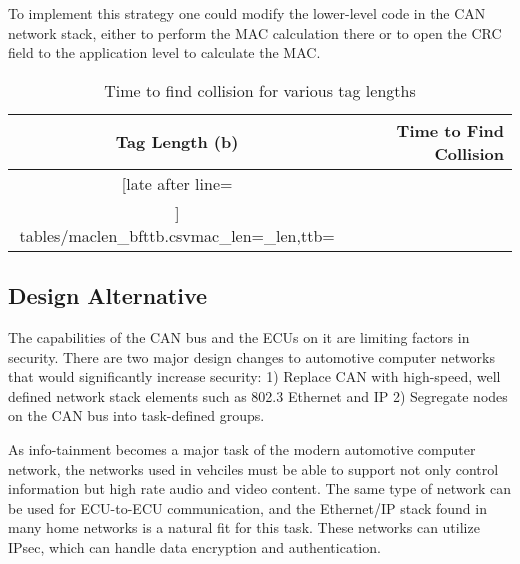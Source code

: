 
To implement this strategy one could modify the lower-level code in the CAN network stack, 
either to perform the MAC calculation there 
or to open the CRC field to the application level to calculate the MAC.


	\begin{table}	
	\centering
	\caption{Time to find collision for various tag lengths}\label{tab-taglength}
	\vspace{8pt}
	\begin{tabular}{|c|r|}\hline%
	\bfseries Tag Length (b) & \bfseries Time to Find Collision\\\hline \csvreader[late after line=\\]%
		{tables/maclen_bfttb.csv}{mac_len=\mac_len,ttb=\ttb}%
		{\mac_len & \ttb}%
		\hline
	\end{tabular}
	\end{table}
	

\subsection{Design Alternative}
\label{alternatives}

The capabilities of the CAN bus and the ECUs on it are limiting factors in security. There are two major design changes to automotive computer networks that would significantly increase security: 1) Replace CAN with high-speed, well defined network stack elements such as 802.3 Ethernet and IP 2) Segregate nodes on the CAN bus into task-defined groups.

As info-tainment becomes a major task of the modern automotive computer network, the networks used in vehciles must be able to support not only control information but high rate audio and video content. The same type of network can be used for ECU-to-ECU communication, and the Ethernet/IP stack found in many home networks is a natural fit for this task. These networks can utilize IPsec, which can handle data encryption and authentication.

